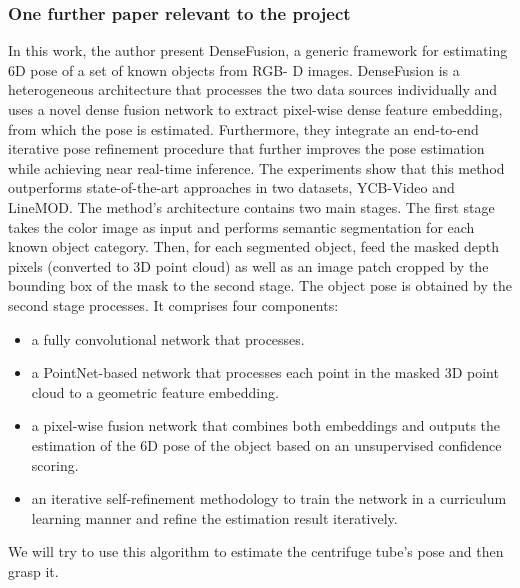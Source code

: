 \documentclass[12pt,draftclsnofoot,onecolumn]{IEEEtran}
\begin{document}
	\subsubsection{One further paper relevant to the project}
	In this work, the author present DenseFusion, a generic framework for estimating 6D pose of a set of known objects from RGB- D images.
	DenseFusion is a heterogeneous architecture that processes the two data sources individually 
	and uses a novel dense fusion network to extract pixel-wise dense feature embedding, from which the pose is estimated.
	Furthermore, they integrate an end-to-end iterative pose refinement procedure that further improves the pose estimation 
	while achieving near real-time inference. 
	The experiments show that this method outperforms state-of-the-art approaches in two datasets, YCB-Video and LineMOD. 
	The method's architecture contains two main stages. 
	The first stage takes the color image as input and performs semantic segmentation for each known object category.
	Then, for each segmented object, feed the masked depth pixels (converted to 3D point cloud) as well as an image patch cropped by the bounding box of the mask to the second stage.
	The object pose is obtained by the second stage processes.
	It comprises four components:
	\begin{itemize}
		\item  a fully convolutional network that processes.
		\item a PointNet-based network that processes each point in the masked 3D point cloud to a geometric feature embedding.
		\item a pixel-wise fusion network that combines both embeddings and outputs the estimation of the 6D pose of the object based on an unsupervised confidence scoring.
		\item an iterative self-refinement methodology to train the network in a curriculum learning manner and refine the estimation result iteratively.
	\end{itemize}
	We will try to use this algorithm to estimate the centrifuge tube's pose and then grasp it. 
	
\end{document}
